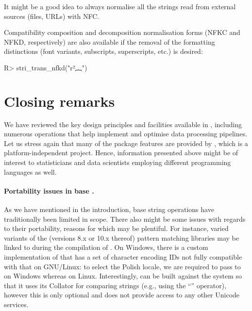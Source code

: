\documentclass[nojss]{jss}\usepackage[]{graphicx}\usepackage[]{color}
\newcommand{\strq}[1]{\code{{"{}#1"{}}}}
\begin{document}
It might be a good idea to always normalise all the strings
read from external sources (files, URLs) with NFC.

Compatibility composition and decomposition normalisation forms (NFKC and
NFKD, respectively) are also available if
the removal of the formatting distinctions (font variants,
subscripts, superscripts, etc.) is desired:


\begin{Schunk}
\begin{Sinput}
R> stri_trans_nfkd("r²︷")
\end{Sinput}
\begin{Soutput}
[1] "r2{"
\end{Soutput}
\end{Schunk}





\section{Closing remarks}\label{Sec:conclusions}



%

We have reviewed the key design principles and facilities available in
, including numerous operations
that  help implement and optimise data processing pipelines.
Let us stress again that many of the package features are provided by , which
is a platform-independent project. Hence, information
presented above might be of interest to statisticians and data scientists
employing different programming languages as well.





\paragraph{Portability issues in base .}
As we have mentioned in the introduction,
base  string operations have traditionally been
limited in scope. There also might be some issues with regards to their portability,
reasons for which may be plentiful.
For instance, varied variants of the
 (versions 8.x or 10.x thereof)
pattern matching libraries may be linked to
during the compilation of . On Windows, there is a custom implementation
of  that has a set of character encoding
IDs not fully compatible with that on GNU/Linux: to select
the Polish locale, we are required to pass \strq{Polish\_Poland}
to  on Windows whereas \strq{pl\_PL} on
Linux.
Interestingly,  can be built against the system 
so that it uses its Collator for comparing strings (e.g., using the ``\code{<=}''
operator), however this is only optional and does not provide access to any
other Unicode services.
\end{document}
